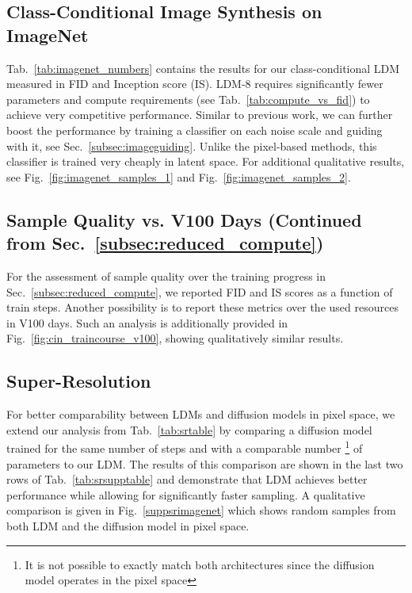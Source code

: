 \documentclass[10pt,twocolumn,letterpaper]{article}
\begin{document}
\subsection{Class-Conditional Image Synthesis on ImageNet}
\label{suppsec:cin}
Tab.~\ref{tab:imagenet_numbers} contains the results for our class-conditional LDM measured in FID and Inception score (IS). 
LDM-8 requires significantly fewer parameters and compute requirements (see Tab.~\ref{tab:compute_vs_fid}) to achieve very competitive performance. Similar to previous work, we can further boost the performance by training a classifier on each noise scale and guiding with it, see Sec.~\ref{subsec:imageguiding}.
Unlike the pixel-based methods, this classifier is trained very cheaply in latent space.
For additional qualitative results, see Fig.~\ref{fig:imagenet_samples_1} and Fig.~\ref{fig:imagenet_samples_2}.

\cinmetrics

\subsection{Sample Quality vs. V100 Days (Continued from Sec.~\ref{subsec:reduced_compute})}
\cinprogressvdays
For the assessment of sample quality over the training progress in Sec.~\ref{subsec:reduced_compute}, we reported FID and IS scores as a function of train steps. Another possibility is to report these metrics over the used resources in V100 days. Such an analysis is additionally provided in Fig.~\ref{fig:cin_traincourse_v100}, showing qualitatively similar results.


\subsection{Super-Resolution}
\label{suppsec:superres}
\srsuppptable
For better comparability between LDMs and diffusion models in pixel space, we extend our analysis from Tab.~\ref{tab:srtable} by comparing a diffusion model trained for the same number of steps and with a comparable number \footnote{It is not possible to exactly match both architectures since the diffusion model operates in the pixel space} of parameters to our LDM. The results of this comparison are shown in the last two rows of Tab.~\ref{tab:srsupptable} and demonstrate that LDM achieves better performance while allowing for significantly faster sampling. 
A qualitative comparison is given in Fig.~\ref{suppsrimagenet} which shows random samples from both LDM and the diffusion model in pixel space.
\end{document}
